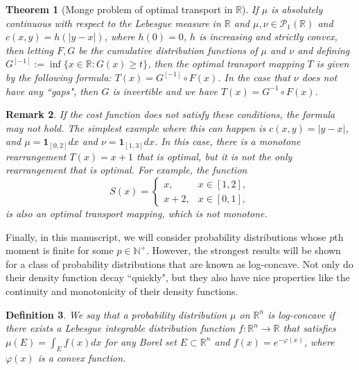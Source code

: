 \documentclass{amsart}
\newtheorem{theorem}{Theorem}
\theoremstyle{lemma}
\newtheorem{definition}[theorem]{Definition}
\newtheorem{remark}[theorem]{Remark}
\theoremstyle{remark}
\begin{document}
\begin{theorem}[Monge problem of optimal transport in $\mathbb{R}$]\label{thm:onedim}
If $\mu$ is absolutely continuous with respect to the Lebesgue measure in $\mathbb{R}$ and $\mu, \nu \in \mathcal{P}_{1}(\mathbb{R})$ and $c(x,y) = h(\vert y - x \vert)$, where $h(0) = 0$, $h$ is increasing and strictly convex, then letting $F, G$ be the cumulative distribution functions of $\mu$ and $\nu$ and defining $G^{[-1]}:= \inf \{ x \in \mathbb{R}: G(x) \geq t \}$, then the optimal transport mapping $T$ is given by the following formula: $T(x) = G^{[-1]} \circ F(x)$. In the case that $\nu$ does not have any ``gaps", then $G$ is invertible and we have $T(x) = G^{-1} \circ F(x)$.
\end{theorem}
\begin{remark}
If the cost function does not satisfy these conditions, the formula may not hold. The simplest example where this can happen is $c(x,y) = \vert y - x \vert$, and $\mu = \mathbf{1}_{[0,2]}dx$ and $\nu = \mathbf{1}_{[1,3]}dx$. In this case, there is a monotone rearrangement $T(x) = x + 1$ that is optimal, but it is not the only rearrangement that is optimal. For example, the function
\begin{equation}
S(x) = \begin{cases}
x, &x \in [1,2], \\
x + 2, &x \in [0, 1],
\end{cases}
\end{equation}
is also an optimal transport mapping, which is not monotone.
\end{remark}

Finally, in this manuscript, we will consider probability distributions whose $p$th moment is finite for some $p \in \mathbb{N}^{+}$. However, the strongest results will be shown for a class of probability distributions that are known as log-concave. Not only do their density function decay ``quickly", but they also have nice properties like the continuity and monotonicity of their density functions.

\begin{definition}\label{def:logconcave}
We say that a probability distribution $\mu$ on $\mathbb{R}^n$ is log-concave if there exists a Lebesgue integrable distribution function $f: \mathbb{R}^n \rightarrow \mathbb{R}$ that satisfies $\mu(E) = \int_{E} f(x)dx$ for any Borel set $E \subset \mathbb{R}^n$ and $f(x) = e^{-\varphi(x)}$, where $\varphi(x)$ is a convex function.
\end{definition}
\end{document}
